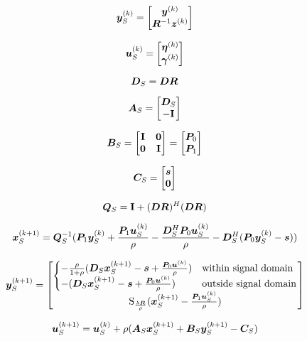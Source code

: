 \documentclass{article}
\begin{document}
\begin{equation}
\bm{y}_S^{(k)} = \begin{bmatrix} \bm{y}^{(k)} \\ \bm{R}^{-1}\bm{z}^{(k)} \end{bmatrix}
\end{equation}

\begin{equation}
\bm{u}_S^{(k)} = \begin{bmatrix} \bm{\eta}^{(k)} \\ \bm{\gamma}^{(k)} \end{bmatrix}
\end{equation}

\begin{equation}
\bm{D}_S = \bm{D}\bm{R}
\end{equation}

\begin{equation}
\bm{A}_S = \begin{bmatrix} \bm{D}_S \\ -{\bf I} \end{bmatrix}
\end{equation}

\begin{equation}
\bm{B}_S = \begin{bmatrix} {\bf I} & \bm{0} \\ \bm{0} & {\bf I} \end{bmatrix} = \begin{bmatrix} \bm{P}_0 \\ \bm{P}_1 \end{bmatrix}
\end{equation}

\begin{equation}
\bm{C}_S = \begin{bmatrix} \bm{s} \\ \bm{0} \end{bmatrix}
\end{equation}

\begin{equation}
\bm{Q}_S = {\bf I} + (\bm{D}\bm{R})^H(\bm{D}\bm{R})
\end{equation}





\begin{equation}
\bm{x}_S^{(k + 1)} = \bm{Q}_S^{-1}(\bm{P}_1\bm{y}_S^{(k)} + \frac{\bm{P}_1\bm{u}_S^{(k)}}{\rho} - \frac{\bm{D}_S^H\bm{P}_0\bm{u}_S^{(k)}}{\rho} - \bm{D}_S^H(\bm{P}_0\bm{y}_S^{(k)} - \bm{s}))
\end{equation}

\begin{equation}
\bm{y}_S^{(k + 1)} = \begin{bmatrix}
\begin{cases}
-\frac{\rho}{1 + \rho}(\bm{D}_S\bm{x}_S^{(k + 1)} - \bm{s}  + \frac{\bm{P}_0\bm{u}^{(k)}}{\rho}) & \text{within signal domain}\\
-(\bm{D}_S\bm{x}_S^{(k + 1)} - \bm{s}  + \frac{\bm{P}_0\bm{u}^{(k)}}{\rho}) & \text{outside signal domain}
\end{cases} \\
\operatorname{S}_{\frac{\lambda\bm{R}}{\rho}}(\bm{x}_S^{(k+1)} - \frac{\bm{P}_1\bm{u}_S^{(k)}}{\rho})
\end{bmatrix}
\end{equation}


\begin{equation}
\bm{u}_S^{(k + 1)} = \bm{u}_S^{(k)} + \rho(\bm{A}_S\bm{x}_S^{(k + 1)} + \bm{B}_S\bm{y}_S^{(k + 1)} - \bm{C}_S)
\end{equation}
\end{document}
